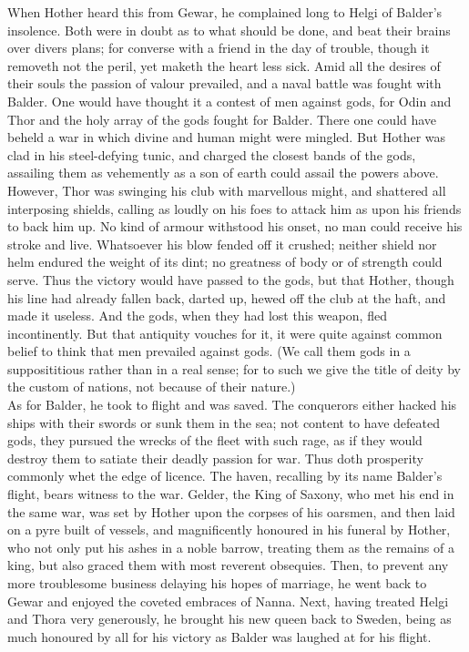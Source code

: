 \documentclass[10pt,a4paper]{report}
\begin{document}
When Hother heard this from Gewar, he complained long to Helgi of Balder's insolence. Both were in doubt as to what should be done, and beat their brains over divers plans; for converse with a friend in the day of trouble, though it removeth not the peril, yet maketh the heart less sick. Amid all the desires of their souls the passion of valour prevailed, and a naval battle was fought with Balder. One would have thought it a contest of men against gods, for Odin and Thor and the holy array of the gods fought for Balder. There one could have beheld a war in which divine and human might were mingled. But Hother was clad in his steel-defying tunic, and charged the closest bands of the gods, assailing them as vehemently as a son of earth could assail the powers above. However, Thor was swinging his club with marvellous might, and shattered all interposing shields, calling as loudly on his foes to attack him as upon his friends to back him up. No kind of armour withstood his onset, no man could receive his stroke and live. Whatsoever his blow fended off it crushed; neither shield nor helm endured the weight of its dint; no greatness of body or of strength could serve. Thus the victory would have passed to the gods, but that Hother, though his line had already fallen back, darted up, hewed off the club at the haft, and made it useless. And the gods, when they had lost this weapon, fled incontinently. But that antiquity vouches for it, it were quite against common belief to think that men prevailed against gods. (We call them gods in a supposititious rather than in a real sense; for to such we give the title of deity by the custom of nations, not because of their nature.)\\

As for Balder, he took to flight and was saved. The conquerors either hacked his ships with their swords or sunk them in the sea; not content to have defeated gods, they pursued the wrecks of the fleet with such rage, as if they would destroy them to satiate their deadly passion for war. Thus doth prosperity commonly whet the edge of licence. The haven, recalling by its name Balder's flight, bears witness to the war. Gelder, the King of Saxony, who met his end in the same war, was set by Hother upon the corpses of his oarsmen, and then laid on a pyre built of vessels, and magnificently honoured in his funeral by Hother, who not only put his ashes in a noble barrow, treating them as the remains of a king, but also graced them with most reverent obsequies. Then, to prevent any more troublesome business delaying his hopes of marriage, he went back to Gewar and enjoyed the coveted embraces of Nanna. Next, having treated Helgi and Thora very generously, he brought his new queen back to Sweden, being as much honoured by all for his victory as Balder was laughed at for his flight.\\
\end{document}
